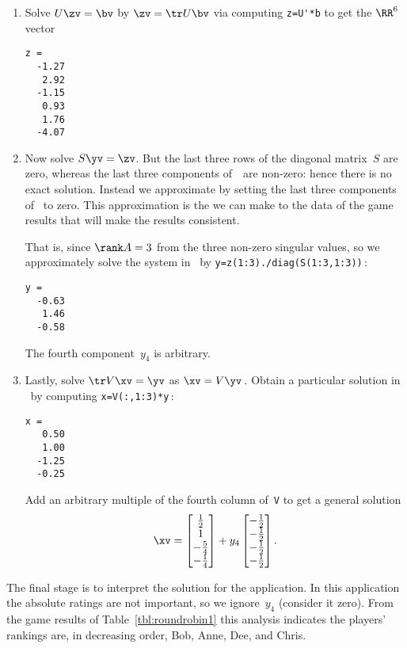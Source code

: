\begin{example}
\begin{solution}
\begin{enumerate}
\item Solve \(U\zv=\bv\) by  \(\zv=\tr U\bv\) via computing \verb|z=U'*b| to get the \(\RR^6\) vector
\begin{verbatim}
z =
  -1.27
   2.92
  -1.15
   0.93
   1.76
  -4.07
\end{verbatim}

\item Now solve \(S\yv=\zv\).
But the last three rows of the diagonal matrix~\(S\) are zero, whereas the last three components of~\zv\ are non-zero: hence there is no exact solution. 
Instead we approximate by setting the last three components of \zv\ to zero.
This approximation is the \emph{} we can make to the data of the game results that will make the results consistent.

That is, since \(\rank A=3\) from the three non-zero singular values, so we approximately solve the system in \script\ by \verb|y=z(1:3)./diag(S(1:3,1:3))|\,:
\begin{verbatim}
y =
  -0.63
   1.46
  -0.58
\end{verbatim}
The fourth component~\(y_4\) is arbitrary.

\item Lastly, solve \(\tr V\xv=\yv\) as \(\xv=V\yv\)\,. 
Obtain a particular solution in \script\ by computing \verb|x=V(:,1:3)*y|\,:
\begin{verbatim}
x =
   0.50
   1.00
  -1.25
  -0.25
\end{verbatim}
Add an arbitrary multiple of the fourth column of~\verb|V| to get a general solution
\begin{equation*}
\xv=\begin{bmatrix} \frac12\\1\\-\frac54\\-\frac14 \end{bmatrix}
+y_4\begin{bmatrix} -\frac12\\ -\frac12\\ -\frac12\\ -\frac12 \end{bmatrix}.
\end{equation*}
\end{enumerate}
The final stage is to interpret the solution for the application.
In this application the absolute ratings are not important, so we ignore~\(y_4\) (consider it zero).  
From the game results of Table~\ref{tbl:roundrobin1} this analysis indicates the players' rankings are, in decreasing order, Bob, Anne, Dee, and Chris.
\end{solution}
\end{example}



